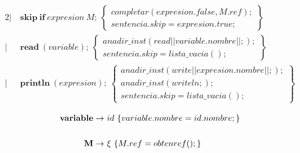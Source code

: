 \documentclass[12pt,a4paper,landscape]{article}
\theoremstyle{mytheor}
\begin{document}
  \begin{alignat*}{2}
   |\ &\textbf{skip}\ \textbf{if}\ expresion\ M;\ \begin{Bmatrix} completar(expresion.false,M.ref); \\ sentencia.skip =expresion.true; \end{Bmatrix}\\
   |\ &\textbf{read}\ (variable);\ \begin{Bmatrix} anadir\_inst(read||variable.nombre||;);\\ sentencia.skip=lista\_vacia();\end{Bmatrix}\\
 |\ &\textbf{println} \ (expresion);\  \begin{Bmatrix} anadir\_inst(write||expresion.nombre||;); \\ anadir\_inst(writeln;); \\ sentencia.skip=lista\_vacia(); \end{Bmatrix}\\
 \end{alignat*}
 \begin{alignat*}{2}
     \text{\textbf{variable}} \to\ & id\ \{variable.nombre = id.nombre;\} \\\\
     \text{\textbf{M}} \to\ &\xi\ \{M.ref=obtenref();\}
  \end{alignat*}
\end{document}
